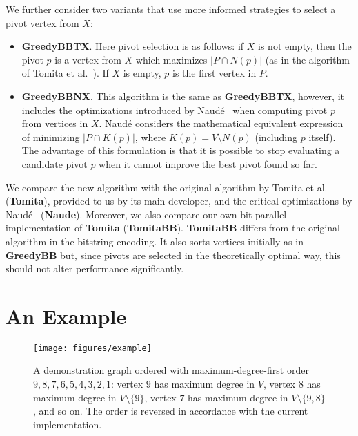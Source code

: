 \documentclass[final,1p]{elsarticle-modified}
\newcommand{\alg}[1]{\textbf{#1}}
\begin{document}
We further consider two variants that use more informed strategies to select a pivot vertex from $X$:
\begin{itemize}
\item \alg{GreedyBBTX}. Here pivot selection is as follows: if $X$ is not empty, then the pivot $p$ is a vertex from $X$ which maximizes $|P\cap N(p)|$ (as in the algorithm of Tomita et al.~\cite{tomita-2006}). If $X$ is empty, $p$ is the first vertex in $P$.
\item \alg{GreedyBBNX}. This algorithm is the same as \alg{GreedyBBTX}, however, it includes the optimizations introduced by Naud\'e~\cite{naude-2016} when computing pivot $p$ from vertices in $X$. Naud\'e considers the mathematical equivalent expression of minimizing $|P\cap K(p)|$, where $K(p)=V\setminus N(p)$ (including $p$ itself). The advantage of this formulation is that it is possible to stop evaluating a candidate pivot $p$ when it cannot improve the best pivot found so far.
\end{itemize}

We compare the new algorithm with the original algorithm by Tomita et al.~\cite{tomita-2006} (\alg{Tomita}), provided to us by its main developer, and the critical optimizations by Naud\'e~\cite{naude-2016} (\alg{Naude}). Moreover, we also compare our own bit-parallel implementation of \alg{Tomita} (\alg{TomitaBB}). \alg{TomitaBB} differs from the original algorithm in the bitstring encoding. It also sorts vertices initially as in \alg{GreedyBB} but, since pivots are selected in the theoretically optimal way, this should not alter performance significantly.


\section{An Example}

\begin{figure}[!tb]
\centering
\texttt{[image: figures/example]}
\caption{A demonstration graph ordered with maximum-degree-first order $9, 8, 7, 6, 5, 4, 3, 2, 1$: vertex $9$ has maximum degree in $V$, vertex $8$ has maximum degree in $V\setminus\{9\}$, vertex $7$ has maximum degree in $V\setminus\{9,8\}$, and so on. The order is reversed in accordance with the current implementation.}
\label{figure:example}
\end{figure}
\end{document}
